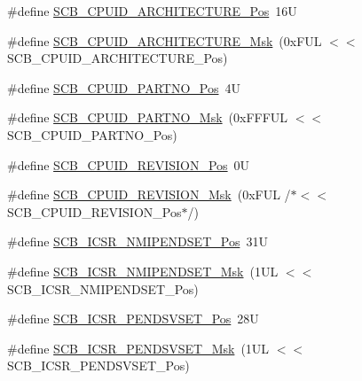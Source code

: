 \begin{DoxyCompactItemize}
\item 
\#define \mbox{\hyperlink{group___c_m_s_i_s___s_c_b_gaf8b3236b08fb8e840efb682645fb0e98}{S\+C\+B\+\_\+\+C\+P\+U\+I\+D\+\_\+\+A\+R\+C\+H\+I\+T\+E\+C\+T\+U\+R\+E\+\_\+\+Pos}}~16U
\item 
\#define \mbox{\hyperlink{group___c_m_s_i_s___s_c_b_gafae4a1f27a927338ae9dc51a0e146213}{S\+C\+B\+\_\+\+C\+P\+U\+I\+D\+\_\+\+A\+R\+C\+H\+I\+T\+E\+C\+T\+U\+R\+E\+\_\+\+Msk}}~(0x\+F\+U\+L $<$$<$ S\+C\+B\+\_\+\+C\+P\+U\+I\+D\+\_\+\+A\+R\+C\+H\+I\+T\+E\+C\+T\+U\+R\+E\+\_\+\+Pos)
\item 
\#define \mbox{\hyperlink{group___c_m_s_i_s___s_c_b_ga705f68eaa9afb042ca2407dc4e4629ac}{S\+C\+B\+\_\+\+C\+P\+U\+I\+D\+\_\+\+P\+A\+R\+T\+N\+O\+\_\+\+Pos}}~4U
\item 
\#define \mbox{\hyperlink{group___c_m_s_i_s___s_c_b_ga98e581423ca016680c238c469aba546d}{S\+C\+B\+\_\+\+C\+P\+U\+I\+D\+\_\+\+P\+A\+R\+T\+N\+O\+\_\+\+Msk}}~(0x\+F\+F\+F\+U\+L $<$$<$ S\+C\+B\+\_\+\+C\+P\+U\+I\+D\+\_\+\+P\+A\+R\+T\+N\+O\+\_\+\+Pos)
\item 
\#define \mbox{\hyperlink{group___c_m_s_i_s___s_c_b_ga3c3d9071e574de11fb27ba57034838b1}{S\+C\+B\+\_\+\+C\+P\+U\+I\+D\+\_\+\+R\+E\+V\+I\+S\+I\+O\+N\+\_\+\+Pos}}~0U
\item 
\#define \mbox{\hyperlink{group___c_m_s_i_s___s_c_b_ga2ec0448b6483f77e7f5d08b4b81d85df}{S\+C\+B\+\_\+\+C\+P\+U\+I\+D\+\_\+\+R\+E\+V\+I\+S\+I\+O\+N\+\_\+\+Msk}}~(0x\+F\+U\+L /$\ast$$<$$<$ S\+C\+B\+\_\+\+C\+P\+U\+I\+D\+\_\+\+R\+E\+V\+I\+S\+I\+O\+N\+\_\+\+Pos$\ast$/)
\item 
\#define \mbox{\hyperlink{group___c_m_s_i_s___s_c_b_ga750d4b52624a46d71356db4ea769573b}{S\+C\+B\+\_\+\+I\+C\+S\+R\+\_\+\+N\+M\+I\+P\+E\+N\+D\+S\+E\+T\+\_\+\+Pos}}~31U
\item 
\#define \mbox{\hyperlink{group___c_m_s_i_s___s_c_b_ga340e3f79e9c3607dee9f2c048b6b22e8}{S\+C\+B\+\_\+\+I\+C\+S\+R\+\_\+\+N\+M\+I\+P\+E\+N\+D\+S\+E\+T\+\_\+\+Msk}}~(1\+U\+L $<$$<$ S\+C\+B\+\_\+\+I\+C\+S\+R\+\_\+\+N\+M\+I\+P\+E\+N\+D\+S\+E\+T\+\_\+\+Pos)
\item 
\#define \mbox{\hyperlink{group___c_m_s_i_s___s_c_b_gab5ded23d2ab1d5ff7cc7ce746205e9fe}{S\+C\+B\+\_\+\+I\+C\+S\+R\+\_\+\+P\+E\+N\+D\+S\+V\+S\+E\+T\+\_\+\+Pos}}~28U
\item 
\#define \mbox{\hyperlink{group___c_m_s_i_s___s_c_b_ga1e40d93efb402763c8c00ddcc56724ff}{S\+C\+B\+\_\+\+I\+C\+S\+R\+\_\+\+P\+E\+N\+D\+S\+V\+S\+E\+T\+\_\+\+Msk}}~(1\+U\+L $<$$<$ S\+C\+B\+\_\+\+I\+C\+S\+R\+\_\+\+P\+E\+N\+D\+S\+V\+S\+E\+T\+\_\+\+Pos)
\item 

\end{DoxyCompactItemize}
